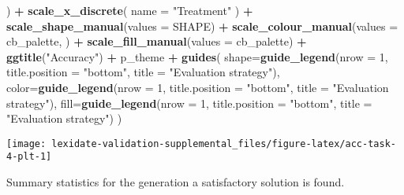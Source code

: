 \documentclass[
]{book}
\newenvironment{Shaded}{\begin{snugshade}}{\end{snugshade}}
\newcommand{\AttributeTok}[1]{\textcolor[rgb]{0.13,0.29,0.53}{#1}}
\newcommand{\DecValTok}[1]{\textcolor[rgb]{0.00,0.00,0.81}{#1}}
\newcommand{\FunctionTok}[1]{\textcolor[rgb]{0.13,0.29,0.53}{\textbf{#1}}}
\newcommand{\NormalTok}[1]{#1}
\newcommand{\SpecialCharTok}[1]{\textcolor[rgb]{0.81,0.36,0.00}{\textbf{#1}}}
\newcommand{\StringTok}[1]{\textcolor[rgb]{0.31,0.60,0.02}{#1}}
\begin{document}
\begin{Shaded}
\begin{Highlighting}[]
\NormalTok{  ) }\SpecialCharTok{+}
  \FunctionTok{scale\_x\_discrete}\NormalTok{(}
    \AttributeTok{name =} \StringTok{"Treatment"}
\NormalTok{  ) }\SpecialCharTok{+}
  \FunctionTok{scale\_shape\_manual}\NormalTok{(}\AttributeTok{values =}\NormalTok{ SHAPE) }\SpecialCharTok{+}
  \FunctionTok{scale\_colour\_manual}\NormalTok{(}\AttributeTok{values =}\NormalTok{ cb\_palette, ) }\SpecialCharTok{+}
  \FunctionTok{scale\_fill\_manual}\NormalTok{(}\AttributeTok{values =}\NormalTok{ cb\_palette) }\SpecialCharTok{+}
  \FunctionTok{ggtitle}\NormalTok{(}\StringTok{"Accuracy"}\NormalTok{) }\SpecialCharTok{+}
\NormalTok{  p\_theme }\SpecialCharTok{+}
  \FunctionTok{guides}\NormalTok{(}
    \AttributeTok{shape=}\FunctionTok{guide\_legend}\NormalTok{(}\AttributeTok{nrow =} \DecValTok{1}\NormalTok{, }\AttributeTok{title.position =} \StringTok{"bottom"}\NormalTok{,}
                       \AttributeTok{title =} \StringTok{"Evaluation strategy"}\NormalTok{),}
    \AttributeTok{color=}\FunctionTok{guide\_legend}\NormalTok{(}\AttributeTok{nrow =} \DecValTok{1}\NormalTok{, }\AttributeTok{title.position =} \StringTok{"bottom"}\NormalTok{,}
                       \AttributeTok{title =} \StringTok{"Evaluation strategy"}\NormalTok{),}
    \AttributeTok{fill=}\FunctionTok{guide\_legend}\NormalTok{(}\AttributeTok{nrow =} \DecValTok{1}\NormalTok{, }\AttributeTok{title.position =} \StringTok{"bottom"}\NormalTok{,}
                      \AttributeTok{title =} \StringTok{"Evaluation strategy"}\NormalTok{)}
\NormalTok{  )}
\end{Highlighting}
\end{Shaded}

\texttt{[image: lexidate-validation-supplemental\_files/figure-latex/acc-task-4-plt-1]}

Summary statistics for the generation a satisfactory solution is found.
\end{document}
